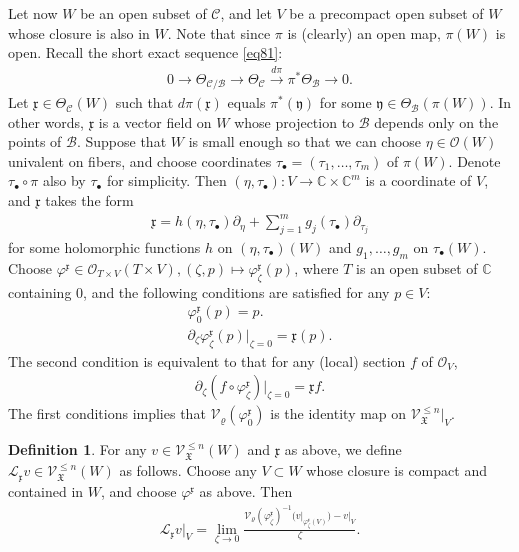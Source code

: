 \documentclass[12pt,b5paper,notitlepage]{report}
\theoremstyle{definition}
\newtheorem{df}{Definition}[section]
\theoremstyle{plain}
\newcommand{\fk}{\mathfrak}
\newcommand{\mc}{\mathcal}
\newcommand{\scr}{\mathscr}
\newcommand{\blt}{\bullet}
\newcommand{\Cbb}{\mathbb C}
\numberwithin{equation}{section}
\begin{document}
Let now $W$ be an open subset of $\mc C$, and let $V$ be a precompact open subset of $W$ whose closure is also in $W$. Note that since $\pi$ is (clearly) an open map, $\pi(W)$ is open. Recall the short exact sequence \eqref{eq81}:
\begin{align*}
0\rightarrow \Theta_{\mc C/\mc B}\rightarrow \Theta_{\mc C}\xrightarrow{d\pi}\pi^*\Theta_{\mc B}\rightarrow 0.
\end{align*}
Let $\fk x\in\Theta_{\mc C}(W)$ such that $d\pi(\fk x)$ equals $\pi^*(\fk y)$ for some $\fk y\in\Theta_{\mc B}(\pi(W))$. In other words, $\fk x$ is a vector field on $W$ whose projection to $\mc B$ depends only on the points of $\mc B$. Suppose that $W$ is small enough so that  we can choose $\eta\in\scr O(W)$ univalent on fibers, and choose coordinates  $\tau_\blt=(\tau_1,\dots,\tau_m)$ of $\pi(W)$. Denote $\tau_\blt\circ\pi$ also by $\tau_\blt$ for simplicity. Then $(\eta,\tau_\blt):V\rightarrow\Cbb\times\Cbb^m$ is a coordinate of $V$, and $\fk x$ takes the form
\begin{align}
\fk x=h(\eta,\tau_\blt)\partial_\eta+\sum_{j=1}^m g_j(\tau_\blt)\partial_{\tau_j}\label{eq85}
\end{align}
for some holomorphic functions $h$ on $(\eta,\tau_\blt)(W)$ and $g_1,\dots,g_m$ on $\tau_\blt(W)$.  Choose $\varphi^{\fk x}\in\scr O_{T\times V}(T\times V),(\zeta,p)\mapsto \varphi^{\fk x}_\zeta(p)$, where $T$ is an open subset of $\Cbb$ containing $0$, and  the following conditions are satisfied for any $p\in V$:
\begin{gather}
\varphi^{\fk x}_0(p)=p.\label{eq83}\\
\partial_\zeta\varphi^{\fk x}_\zeta(p)\big|_{\zeta=0}=\fk x(p).\label{eq84}
\end{gather}
The second condition is equivalent to that for any (local) section $f$ of $\scr O_V$,
\begin{gather}
\partial_\zeta (f\circ\varphi^{\fk x}_\zeta)\Big|_{\zeta=0}=\fk x f.\label{eq88}
\end{gather}
The first conditions implies that $\mc V_\varrho(\varphi^{\fk x}_0)$ is the identity map on $\scr V^{\leq n}_{\fk X}|_V$.


\begin{df}
For any $v\in\scr V_{\fk X}^{\leq n}(W)$ and $\fk x$ as above, we define $\mc L_{\fk x}v\in\scr V_{\fk X}^{\leq n}(W)$ as follows. Choose any $V\subset W$ whose closure is compact and contained in $W$,  and choose $\varphi^{\fk x}$ as above. Then
\begin{align}
\mc L_{\fk x}v\big|_V=\lim_{\zeta\rightarrow 0}\frac{\mc V_\varrho(\varphi^{\fk x}_\zeta)^{-1}\big(v\big|_{\varphi^{\fk x}_\zeta(V)}\big)-v\big|_V}{\zeta}.\label{eq89}
\end{align}
\end{df}
\end{document}
